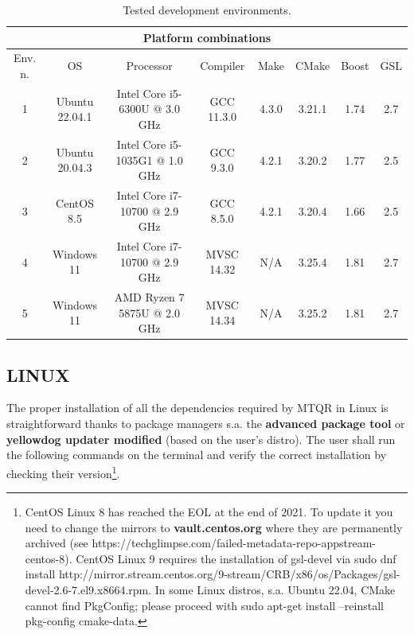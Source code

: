 \documentclass[a4paper, twosided]{book}
\begin{document}
\begin{table}[H]
\centering
\begin{tabular}{|c||c|c|c|c|c|c|c|}
\hline
\multicolumn{8}{|c|}{\textbf{Platform combinations}} \\
\hline
Env. n. & OS & Processor & Compiler & Make & CMake & Boost & GSL \\
\hline
1 & Ubuntu 22.04.1 & Intel Core i5-6300U @ 3.0 GHz & GCC 11.3.0 & 4.3.0 & 3.21.1 & 1.74 & 2.7 \\
2 & Ubuntu 20.04.3 & Intel Core i5-1035G1 @ 1.0 GHz & GCC 9.3.0 & 4.2.1 & 3.20.2 & 1.77 & 2.5 \\
3 & CentOS 8.5 & Intel Core i7-10700 @ 2.9 GHz  & GCC 8.5.0 & 4.2.1 & 3.20.4 & 1.66 & 2.5 \\
4 & Windows 11 & Intel Core i7-10700 @ 2.9 GHz  & MVSC 14.32 & N/A & 3.25.4 & 1.81 & 2.7 \\
5 & Windows 11 & AMD Ryzen 7 5875U @ 2.0 GHz & MVSC 14.34 & N/A & 3.25.2 & 1.81 & 2.7 \\
\hline
\end{tabular}
  \caption{Tested development environments.}
  \label{table2.1}
\end{table}

\subsection[Linux]{\changefont LINUX}\label{SubSec2.1.1}

The proper installation of all the dependencies required by MTQR in Linux is straightforward thanks to package managers s.a. the \color{poliDarkBlue} \textbf{advanced package tool} \color{black} or \color{poliDarkBlue} \textbf{yellowdog updater modified} \color{black} (based on the user's distro). The user shall run the following commands on the terminal and verify the correct installation by checking their version\footnote{CentOS Linux 8 has reached the EOL at the end of 2021. To update it you need to change the mirrors to \color{poliDarkBlue} \textbf{vault.centos.org} \color{black} where they are permanently archived (see https://techglimpse.com/failed-metadata-repo-appstream-centos-8). CentOS Linux 9 requires the installation of gsl-devel via 
\colorbox{poliGrayBlue}{sudo dnf install http://mirror.stream.centos.org/9-stream/CRB/x86/os/Packages/gsl-devel-2.6-7.el9.x86\textunderscore64.rpm}. In some Linux distros, s.a. Ubuntu 22.04, CMake cannot find PkgConfig; please proceed with \colorbox{poliGrayBlue}{sudo apt-get install --reinstall pkg-config cmake-data}.}.
\end{document}
